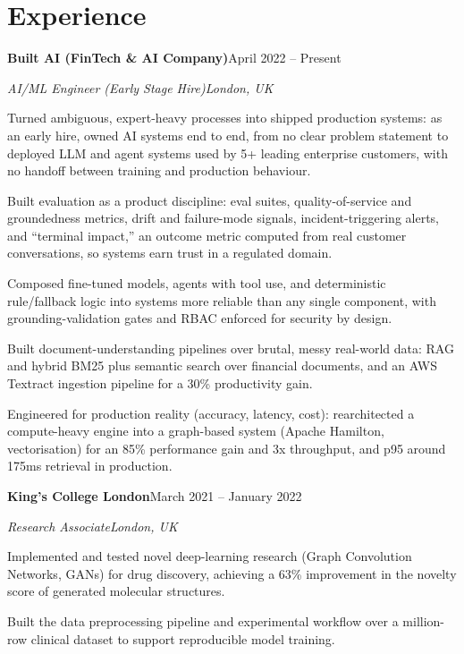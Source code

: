 \documentclass[10pt,a4paper]{article}
\newcommand{\entry}[4]{%
  {\color{company}\bfseries #1}\hfill {\color{muted}#2}\par
  \vspace{1pt}
  {\itshape #3}\hfill {\color{muted}\itshape #4}\par
  \vspace{3pt}%
}
\begin{document}
\section{Experience}
\entry{Built AI (FinTech \& AI Company)}{April 2022 -- Present}{AI/ML Engineer (Early Stage Hire)}{London, UK}
\begin{tight}
  \item Turned ambiguous, expert-heavy processes into shipped production systems: as an early hire, owned AI systems end to end, from no clear problem statement to deployed LLM and agent systems used by 5+ leading enterprise customers, with no handoff between training and production behaviour.
  \item Built evaluation as a product discipline: eval suites, quality-of-service and groundedness metrics, drift and failure-mode signals, incident-triggering alerts, and ``terminal impact,'' an outcome metric computed from real customer conversations, so systems earn trust in a regulated domain.
  \item Composed fine-tuned models, agents with tool use, and deterministic rule/fallback logic into systems more reliable than any single component, with grounding-validation gates and RBAC enforced for security by design.
  \item Built document-understanding pipelines over brutal, messy real-world data: RAG and hybrid BM25 plus semantic search over financial documents, and an AWS Textract ingestion pipeline for a 30\% productivity gain.
  \item Engineered for production reality (accuracy, latency, cost): rearchitected a compute-heavy engine into a graph-based system (Apache Hamilton, vectorisation) for an 85\% performance gain and 3x throughput, and p95 around 175ms retrieval in production.
\end{tight}

\entry{King's College London}{March 2021 -- January 2022}{Research Associate}{London, UK}
\begin{tight}
  \item Implemented and tested novel deep-learning research (Graph Convolution Networks, GANs) for drug discovery, achieving a 63\% improvement in the novelty score of generated molecular structures.
  \item Built the data preprocessing pipeline and experimental workflow over a million-row clinical dataset to support reproducible model training.
\end{tight}
\end{document}
